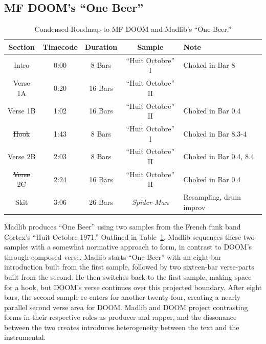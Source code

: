 \subsection*{\centering MF DOOM's ``One Beer''} 

    \begin{table}[ht]
        \centering
            \begin{tabular}{|c|c|c|c|l|}
                 \hline
                  Section         & Timecode & Duration & Sample              & Note                    \\ \hline
                  Intro           & 0:00     & 8 Bars   & ``Huit Octobre'' I  & Choked in Bar 8         \\ \hline
                  Verse 1A        & 0:20     & 16 Bars  & ``Huit Octobre'' II &                         \\ \hline
                  Verse 1B        & 1:02     & 16 Bars  & ``Huit Octobre'' II & Choked in Bar 0.4       \\ \hline
                  \sout{Hook}     & 1:43     & 8 Bars   & ``Huit Octobre'' I  & Choked in Bar 8.3-4     \\ \hline
                  Verse 2B        & 2:03     & 8 Bars   & ``Huit Octobre'' II & Choked in Bar 0.4, 8.4  \\ \hline
                  \sout{Verse 2C} & 2:24     & 16 Bars  & ``Huit Octobre'' II & Choked in Bar 0.4       \\ \hline
                  Skit            & 3:06     & 26 Bars  & \textit{Spider-Man} & Resampling, drum improv \\ \hline
             \end{tabular}
        \caption{Condensed Roadmap to MF DOOM and Madlib's ``One Beer.''}
        \label{tab:onebeer}
    \end{table}

Madlib produces ``One Beer'' using two samples from the French funk band Cortex's ``Huit Octobre 1971.'' Outlined in Table~\ref{tab:onebeer}, Madlib sequences these two samples with a somewhat normative approach to form, in contrast to DOOM's through-composed verse. Madlib starts ``One Beer'' with an eight-bar introduction built from the first sample, followed by two sixteen-bar verse-parts built from the second. He then switches back to the first sample, making space for a hook, but DOOM's verse continues over this projected boundary. After eight bars, the second sample re-enters for another twenty-four, creating a nearly parallel second verse area for DOOM. Madlib and DOOM project contrasting forms in their respective roles as producer and rapper, and the dissonance between the two creates introduces heterogeneity between the text and the instrumental.

